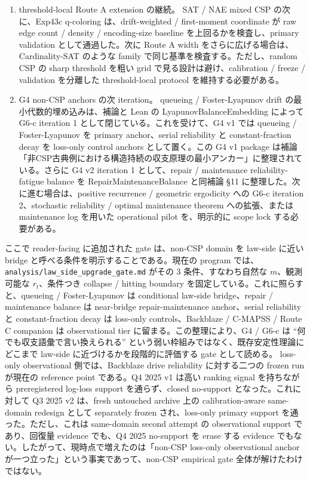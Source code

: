 \documentclass[12pt,a4paper]{article}
\begin{document}
\begin{enumerate}
\def\labelenumi{\arabic{enumi}.}
\item
  threshold-local Route A extension の継続。 SAT / NAE mixed CSP の次に、Exp43c q-coloring は、drift-weighted / first-moment coordinate が raw edge count / density / encoding-size baseline を上回るかを検査し、primary validation として通過した。次に Route A width をさらに広げる場合は、Cardinality-SAT のような family で同じ基準を検査する。ただし、random CSP の sharp threshold を粗い grid で見る設計は避け、calibration / freeze / validation を分離した threshold-local protocol を維持する必要がある。
\item
  G4 non-CSP anchors の次 iteration。 queueing / Foster-Lyapunov drift の最小代数的埋め込みは、補論と Lean の LyapunovBalanceEmbedding によって G6-c iteration 1 として閉じている。これを受けて、G4 v1 では queueing / Foster-Lyapunov を primary anchor、serial reliability と constant-fraction decay を loss-only control anchors として置く。この G4 v1 package は補論「非CSP古典例における構造持続の収支原理の最小アンカー」に整理されている。さらに G4 v2 iteration 1 として、repair / maintenance reliability-fatigue balance を RepairMaintenanceBalance と同補論 §11 に整理した。次に進む場合は、positive recurrence / geometric ergodicity への G6-c iteration 2、stochastic reliability / optimal maintenance theorem への拡張、または maintenance log を用いた operational pilot を、明示的に scope lock する必要がある。
\end{enumerate}

ここで reader-facing に追加された gate は、non-CSP domain を law-side に近い bridge と呼べる条件を明示することである。現在の program では、\texttt{analysis/law\_side\_upgrade\_gate.md} がその 3 条件、すなわち自然な \(m\)、観測可能な \(r_{t}\)、条件つき collapse / hitting boundary を固定している。これに照らすと、queueing / Foster-Lyapunov は conditional law-side bridge、repair / maintenance balance は near-bridge repair-maintenance anchor、serial reliability と constant-fraction decay は loss-only controls、Backblaze / C-MAPSS / Route C companion は observational tier に留まる。この整理により、G4 / G6-c は ``何でも収支語彙で言い換えられる'' という弱い枠組みではなく、既存安定性理論にどこまで law-side に近づけるかを段階的に評価する gate として読める。 loss-only observational 側では、Backblaze drive reliability に対する二つの frozen run が現在の reference point である。Q4 2025 v1 は高い ranking signal を持ちながら preregistered log-loss support を通らず、closed no-support となった。これに対して Q3 2025 v2 は、fresh untouched archive 上の calibration-aware same-domain redesign として separately frozen され、loss-only primary support を通った。ただし、これは same-domain second attempt の observational support であり、回復量 evidence でも、Q4 2025 no-support を erase する evidence でもない。したがって、現時点で増えたのは「non-CSP loss-only observational anchor が一つ立った」という事実であって、non-CSP empirical gate 全体が解けたわけではない。
\end{document}
